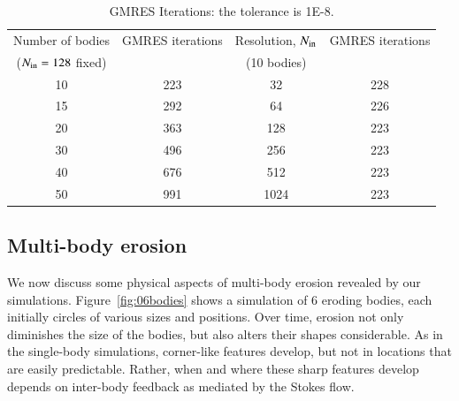 \documentclass[preprint, 10pt]{elsarticle}
\begin{document}
\begin{table}%
\begin{center}
\caption{GMRES Iterations: the tolerance is 1E-8.
}
\vspace{0.3 pc}
\label{itertab}
\begin{tabular}{c c | c c}
\hline
\hspace{0.5pc} Number of bodies
\hspace{0.5pc} & GMRES iterations 
\hspace{0.5pc} & Resolution, $N_{\mathrm{in}}$
\hspace{0.5pc} & GMRES iterations  \\
\hspace{0.0pc} ($N_{\mathrm{in}} = 128$ fixed) & 
\hspace{0.5pc} &(10 bodies) & \\
\hline
%
10	& 223	& 32	    	& 228	\\
15	& 292	& 64    	& 226	\\
20	& 363	& 128	& 223	\\
30	& 496	& 256	& 223	\\
40	& 676	& 512	& 223	\\
50	& 991	& 1024	& 223	\\
%
\hline
\end{tabular}
\end{center}
\end{table}

\subsection{Multi-body erosion}

We now discuss some physical aspects of multi-body erosion revealed by our simulations. Figure~\ref{fig:06bodies} shows a simulation of 6 eroding bodies, each initially circles of various sizes and positions. Over time, erosion not only diminishes the size of the bodies, but also alters their shapes considerable. As in the single-body simulations, corner-like features develop, but not in locations that are easily predictable. Rather, when and where these sharp features develop depends on inter-body feedback as mediated by the Stokes flow.
\end{document}

